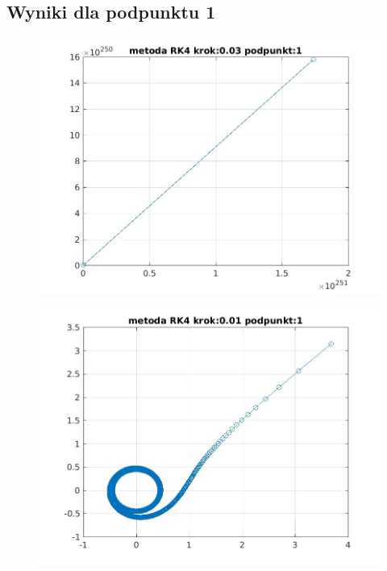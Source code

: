 \documentclass[a4paper, 11pt]{article}
\begin{document}
\subsection{Wyniki dla podpunktu 1}
\begin{figure}[htp]
\centering
\includegraphics[width = 15cm]{2d/metoda RK4 krok:0,03 podpunkt:1.jpg}
\end{figure}

\begin{figure}[htp]
\centering
\includegraphics[width = 15cm]{2d/metoda RK4 krok:0,01 podpunkt:1.jpg}
\end{figure}
\end{document}

